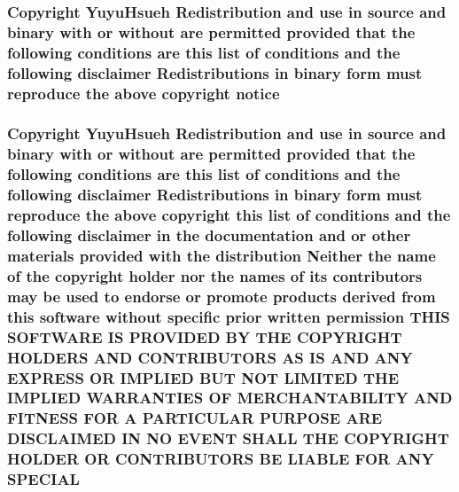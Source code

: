 \subsubsection[{\texorpdfstring{notice}{notice}}]{\setlength{\rightskip}{0pt plus 5cm}Copyright Yuyu\+Hsueh Redistribution and use in source and binary with or without are permitted provided that the following conditions are this list of conditions and the following disclaimer Redistributions in binary form must reproduce the above copyright notice}\hypertarget{license_8txt_af4bbea5cb99610e4ef2a43c12b41e9c9}{}\label{license_8txt_af4bbea5cb99610e4ef2a43c12b41e9c9}
\subsubsection[{\texorpdfstring{S\+P\+E\+C\+I\+AL}{SPECIAL}}]{\setlength{\rightskip}{0pt plus 5cm}Copyright Yuyu\+Hsueh Redistribution and use in source and binary with or without are permitted provided that the following conditions are this list of conditions and the following disclaimer Redistributions in binary form must reproduce the above copyright this list of conditions and the following disclaimer in the documentation and or other materials provided with the distribution Neither the name of the copyright holder nor the names of its contributors may be used to endorse or promote products derived from this software without specific prior written permission T\+H\+IS S\+O\+F\+T\+W\+A\+RE IS P\+R\+O\+V\+I\+D\+ED BY T\+HE C\+O\+P\+Y\+R\+I\+G\+HT H\+O\+L\+D\+E\+RS A\+ND C\+O\+N\+T\+R\+I\+B\+U\+T\+O\+RS AS IS A\+ND A\+NY E\+X\+P\+R\+E\+SS OR I\+M\+P\+L\+I\+ED B\+UT N\+OT L\+I\+M\+I\+T\+ED T\+HE I\+M\+P\+L\+I\+ED {\bf W\+A\+R\+R\+A\+N\+T\+I\+ES} OF M\+E\+R\+C\+H\+A\+N\+T\+A\+B\+I\+L\+I\+TY A\+ND F\+I\+T\+N\+E\+SS F\+OR A P\+A\+R\+T\+I\+C\+U\+L\+AR P\+U\+R\+P\+O\+SE A\+RE D\+I\+S\+C\+L\+A\+I\+M\+ED IN NO E\+V\+E\+NT S\+H\+A\+LL T\+HE C\+O\+P\+Y\+R\+I\+G\+HT H\+O\+L\+D\+ER OR C\+O\+N\+T\+R\+I\+B\+U\+T\+O\+RS BE L\+I\+A\+B\+LE F\+OR A\+NY S\+P\+E\+C\+I\+AL}\hypertarget{license_8txt_a910ad17f295c48bc77c8ee2434bf4ac5}{}\label{license_8txt_a910ad17f295c48bc77c8ee2434bf4ac5}
